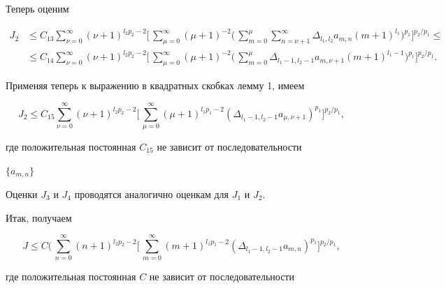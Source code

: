  


Теперь оценим 


\begin{align*} 


J_2&\le C_{13}\sum^\infty_{\nu=0}(\nu+1)^{l_2p_2-2}\biggl[\, 


\sum^\infty_{\mu=0}(\mu+1)^{-2}\biggl(\, 


\sum^\mu_{m=0}\sum^\infty_{n=\nu+1} 


\Delta_{l_1,l_2}a_{m,n}(m+1)^{l_1}\biggr)^{p_1} 


\biggr]^{p_2/p_1}\le \\ 


% 


&\le C_{14}\sum^\infty_{\nu=0}(\nu+1)^{l_2p_2-2}\biggl[\, 


\sum^\infty_{\mu=0}(\mu+1)^{-2}\biggl(\, 


\sum^\mu_{m=0} 


\Delta_{l_1-1,l_2-1}a_{m,\nu+1}(m+1)^{l_1-1}\biggr)^{p_1} 


\biggr]^{p_2/p_1}.


\end{align*} 


Применяя теперь к выражению в квадратных скобках лемму 1, имеем 


$$ 


J_2 \le C_{15}\sum^\infty_{\nu=0}(\nu+1)^{l_2p_2-2}\biggl[\, 


\sum^\infty_{\mu=0}(\mu+1)^{l_1p_1-2} 


(\Delta_{l_1-1,l_2-1}a_{\mu,\nu+1})^{p_1}\biggr]^{p_2/p_1},


$$ 


где положительная постоянная $C_{15}$ не зависит от последовательности 


$\{a_{m,n}\}$ 


 


Оценки $J_3$ и $J_4$ проводятся аналогично оценкам для $J_1$ и $J_2$. 


 


Итак, получаем 


$$ 


J \le C\biggl(\,\sum^\infty_{n=0}(n+1)^{l_2p_2-2}\biggl[\, 


\sum^\infty_{m=0}(m+1)^{l_1p_1-2} 


(\Delta_{l_1-1,l_2-1}a_{m,n})^{p_1}\biggr]^{p_2/p_1},


$$ 


где положительная постоянная $C$ не зависит от последовательности 



